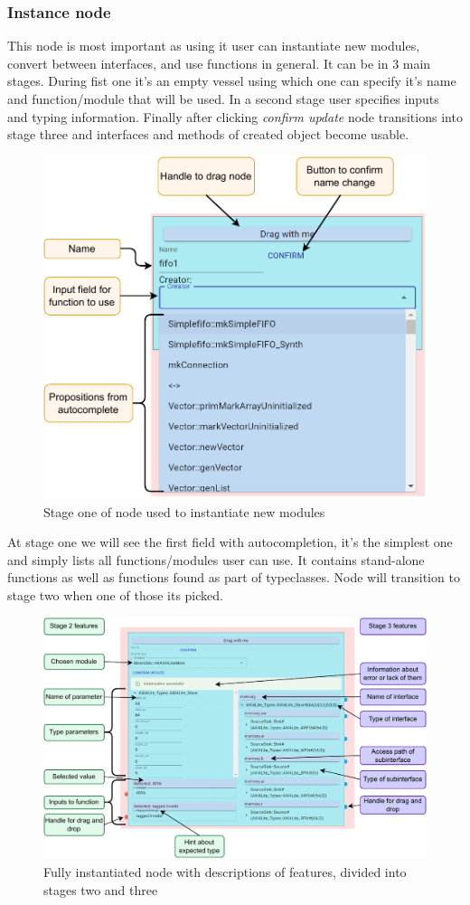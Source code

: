 \documentclass[12pt]{report}
\begin{document}
\subsubsection{Instance node}
This node is most important as using it user can instantiate new modules, convert between interfaces, and use functions in general. It can be in 3 main stages. During fist one it's an empty vessel using which one can specify it's name and function/module that will be used. In a second stage user specifies inputs and typing information. Finally after clicking \emph{confirm update} node transitions into stage three and interfaces and methods of created object become usable.
\newpage
\begin{figure}[!h]
    \centering
    
    \includegraphics[width=0.63\columnwidth]{pdfExports/LargeMapInstanceNode.pdf}
    \caption{Stage one of node used to instantiate new modules}
\end{figure}
At stage one we will see the first field with autocompletion, it's the simplest one and simply lists all functions/modules user can use. It contains stand-alone functions as well as functions found as part of typeclasses. Node will transition to stage two when one of those its picked.
\begin{figure}[!h]
    \centering
    
    \includegraphics[width=1\columnwidth]{pdfExports/LargeMap-InstanceNodePart2.drawio.pdf}
    \caption{Fully instantiated node with descriptions of features, divided into stages two and three}
\end{figure}
\end{document}

